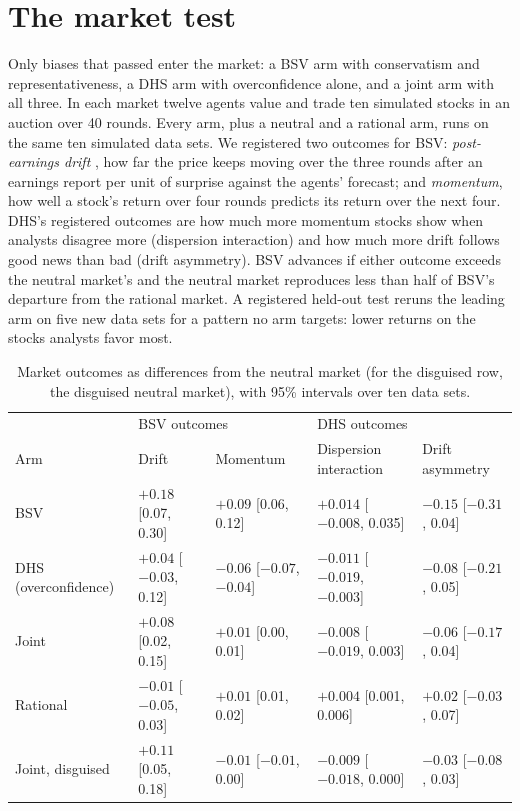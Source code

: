 \documentclass[10pt]{article}
\begin{document}
\section{The market test}

Only biases that passed enter the market: a BSV arm with conservatism and representativeness, a DHS arm with overconfidence alone, and a joint arm with all three. In each market twelve agents value and trade ten simulated stocks in an auction over 40 rounds. Every arm, plus a neutral and a rational arm, runs on the same ten simulated data sets. We registered two outcomes for BSV: \emph{post-earnings drift} \citep{bernard1989post}, how far the price keeps moving over the three rounds after an earnings report per unit of surprise against the agents' forecast; and \emph{momentum}, how well a stock's return over four rounds predicts its return over the next four. DHS's registered outcomes are how much more momentum stocks show when analysts disagree more (dispersion interaction) and how much more drift follows good news than bad (drift asymmetry). BSV advances if either outcome exceeds the neutral market's and the neutral market reproduces less than half of BSV's departure from the rational market. A registered held-out test reruns the leading arm on five new data sets for a pattern no arm targets: lower returns on the stocks analysts favor most.

\begin{table}[h]
\centering\footnotesize\setlength{\tabcolsep}{4pt}
\begin{tabular}{@{}lllll@{}}
\toprule
 & \multicolumn{2}{l}{BSV outcomes} & \multicolumn{2}{l}{DHS outcomes} \\
Arm & Drift & Momentum & Dispersion interaction & Drift asymmetry \\
\midrule
BSV & $+0.18$ [0.07, 0.30] & $+0.09$ [0.06, 0.12] & $+0.014$ [$-0.008$, 0.035] & $-0.15$ [$-0.31$, 0.04] \\
DHS (overconfidence) & $+0.04$ [$-0.03$, 0.12] & $-0.06$ [$-0.07$, $-0.04$] & $-0.011$ [$-0.019$, $-0.003$] & $-0.08$ [$-0.21$, 0.05] \\
Joint & $+0.08$ [0.02, 0.15] & $+0.01$ [0.00, 0.01] & $-0.008$ [$-0.019$, 0.003] & $-0.06$ [$-0.17$, 0.04] \\
Rational & $-0.01$ [$-0.05$, 0.03] & $+0.01$ [0.01, 0.02] & $+0.004$ [0.001, 0.006] & $+0.02$ [$-0.03$, 0.07] \\
Joint, disguised & $+0.11$ [0.05, 0.18] & $-0.01$ [$-0.01$, 0.00] & $-0.009$ [$-0.018$, 0.000] & $-0.03$ [$-0.08$, 0.03] \\
\bottomrule
\end{tabular}
\caption{Market outcomes as differences from the neutral market (for the disguised row, the disguised neutral market), with 95\% intervals over ten data sets.}
\label{tab:market}
\end{table}
\end{document}
